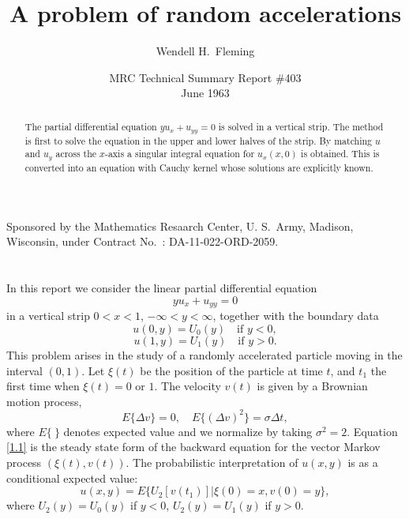 \documentclass[leqno]{article}
\title{A problem of random accelerations}
\author{Wendell H.\ Fleming}
\date{
	MRC Technical Summary Report \#403\\
	June 1963
}
\numberwithin{equation}{section}
\theoremstyle{plain}
\begin{document}
	
\noindent
Sponsored by the Mathematics Resaarch Center, U. S.\ Army, Madison, \\ 
Wisconsin, under Contract No.\ : DA-11-022-ORD-2059.

{\let\newpage\relax\maketitle}

\maketitle

\renewcommand*\abstractname{}

\begin{abstract}
	The partial differential equation $y u_x + u_{yy} = 0$ is solved in a vertical strip.
	The method is first to solve the equation in the upper and lower halves of the strip.
	By matching $u$ and $u_y$ across the $x$-axis a singular integral equation for $u_x(x,0)$ is obtained.
	This is converted into an equation with Cauchy kernel whose solutions are explicitly known.
\end{abstract}

\section{}
\label{sec1}

In this report we consider the linear partial differential equation
\begin{equation}
	\label{1.1}
	y u_x + u_{yy} = 0
\end{equation}
in a vertical strip $0<x<1$, $-\infty<y<\infty$, together with the boundary data
\begin{equation}
	\label{1.2}
	u(0,y) = U_0(y) \quad \text{if } y < 0, 
\end{equation}
\begin{equation*}
	u(1,y) = U_1(y) \quad \text{if } y > 0. 
\end{equation*}
This problem arises in the study of a randomly accelerated particle moving in the interval $(0,1)$.
Let $\xi(t)$ be the position of the particle at time $t$, and $t_1$ the first time when $\xi(t) = 0$ or $1$.
The velocity $v(t)$ is given by a Brownian motion process,
\begin{equation*}
	E\{ \Delta v\} = 0, \quad 
	E\{ (\Delta v)^2 \} = \sigma \Delta t,
\end{equation*}
where $E\{~\}$ denotes expected value and we normalize by taking $\sigma^2 = 2$.
Equation \eqref{1.1} is the steady state form of the backward equation for the vector Markov process $(\xi(t),v(t))$.
The probabilistic interpretation of $u(x,y)$ is as a conditional expected value:
\begin{equation}
	\label{1.3}
	u(x,y) = E\{ U_2[v(t_1)] \rvert \xi(0) = x, v(0) = y \},
\end{equation}
where $U_2(y)=U_0(y)$ if $y < 0$, $U_2(y) = U_1(y)$ if $y > 0$.
\end{document}
